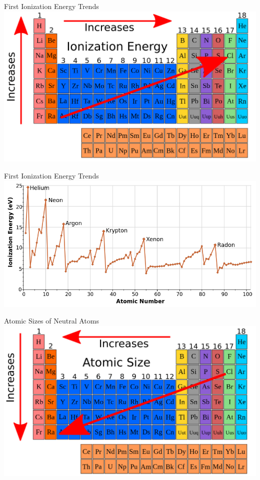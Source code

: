 \documentclass[11pt]{beamer}
\begin{document}
\begin{frame}{First Ionization Energy Trends}
  \centering
  \includegraphics[width=\linewidth]{ion_trends}
\end{frame}


\begin{frame}{First Ionization Energy Trends}
  \centering
  \includegraphics[width=\linewidth]{first-ionization-energy}
\end{frame}

\begin{frame}{Atomic Sizes of Neutral Atoms}
  \centering
  \includegraphics[width=\linewidth]{atomic_trend}
\end{frame}
\end{document}
